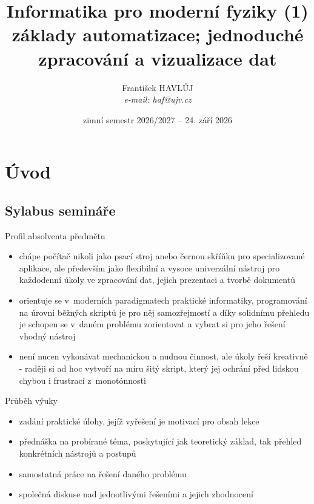 \documentclass{beamer}
\title[IMF (1)]{Informatika pro moderní fyziky (1)\\základy automatizace; jednoduché zpracování a vizualizace dat}
\author[Franti\v{s}ek HAVL\r{U}J, ORF ÚJV Řež]{Franti\v{s}ek HAVL\r{U}J\\{\scriptsize \emph{e-mail: haf@ujv.cz}}}
\date{zimní semestr 2026/2027 – 24. září 2026}
\institute[ORF ÚJV Řež]
{ÚJV Řež – oddělení Reaktorové fyziky a podpory palivového cyklu}
\begin{document}
\begin{frame}
  \titlepage
\end{frame}

\begin{frame}
  \tableofcontents
\end{frame}

\section{Úvod}

\subsection{Sylabus semináře}

\begin{frame}{Profil absolventa předmětu}
  \begin{itemize}
    \item chápe počítač nikoli jako psací stroj anebo černou skříňku pro specializované aplikace, ale především jako flexibilní a vysoce univerzální nástroj pro každodenní úkoly ve zpracování dat, jejich prezentaci a tvorbě dokumentů
    \item orientuje se v~moderních paradigmatech praktické informatiky, programování na úrovni běžných skriptů je pro něj samozřejmostí a díky solidnímu přehledu je schopen se v~daném problému zorientovat a vybrat si pro jeho řešení vhodný nástroj
    \item není nucen vykonávat mechanickou a nudnou činnost, ale úkoly řeší kreativně - raději si ad hoc vytvoří na míru šitý skript, který jej ochrání před lidskou chybou i frustrací z~monotónnosti
  \end{itemize}
\end{frame}

\begin{frame}{Průběh výuky}
  \begin{itemize}
    \item zadání praktické úlohy, jejíž vyřešení je motivací pro obsah lekce
    \item přednáška na probírané téma, poskytující jak teoretický základ, tak přehled konkrétních nástrojů a postupů
    \item samostatná práce na řešení daného problému
    \item společná diskuse nad jednotlivými řešeními a jejich zhodnocení
  \end{itemize}
\end{frame}
\end{document}
